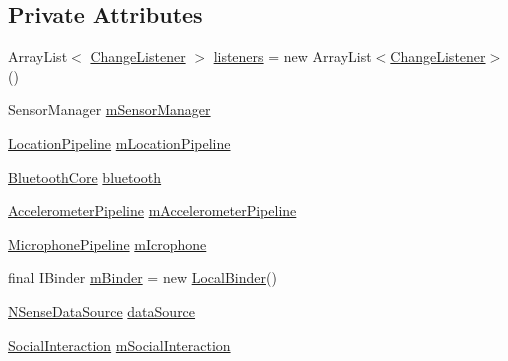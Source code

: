 \subsection*{Private Attributes}
\begin{DoxyCompactItemize}
\item 
Array\-List$<$ \hyperlink{interfacecs_1_1nsense_1_1_change_listener}{Change\-Listener} $>$ \hyperlink{classcs_1_1nsense_1_1_n_sense_service_add437e668afb02ec0fa1c2f20d6cc5df}{listeners} = new Array\-List$<$\hyperlink{interfacecs_1_1nsense_1_1_change_listener}{Change\-Listener}$>$ ()
\item 
Sensor\-Manager \hyperlink{classcs_1_1nsense_1_1_n_sense_service_a663bbb3131b12621b8cf583266d82ead}{m\-Sensor\-Manager}
\item 
\hyperlink{classcs_1_1nsense_1_1location_1_1_location_pipeline}{Location\-Pipeline} \hyperlink{classcs_1_1nsense_1_1_n_sense_service_aa18b9de5a2460c02a578f608c280d1c7}{m\-Location\-Pipeline}
\item 
\hyperlink{classcs_1_1nsense_1_1bluetooth_1_1_bluetooth_core}{Bluetooth\-Core} \hyperlink{classcs_1_1nsense_1_1_n_sense_service_aacd6c54af2899f5ea8e97c4082eadea6}{bluetooth}
\item 
\hyperlink{classcs_1_1nsense_1_1accelerometer_1_1_accelerometer_pipeline}{Accelerometer\-Pipeline} \hyperlink{classcs_1_1nsense_1_1_n_sense_service_a3ce1d75779f97340739041615c544825}{m\-Accelerometer\-Pipeline}
\item 
\hyperlink{classcs_1_1nsense_1_1microphone_1_1_microphone_pipeline}{Microphone\-Pipeline} \hyperlink{classcs_1_1nsense_1_1_n_sense_service_ad27f819aab4981845361ab7accb646e3}{m\-Icrophone}
\item 
final I\-Binder \hyperlink{classcs_1_1nsense_1_1_n_sense_service_a600df19b5f1386cedb4cec1dcdc6bc1c}{m\-Binder} = new \hyperlink{classcs_1_1nsense_1_1_n_sense_service_1_1_local_binder}{Local\-Binder}()
\item 
\hyperlink{classcs_1_1nsense_1_1db_1_1_n_sense_data_source}{N\-Sense\-Data\-Source} \hyperlink{classcs_1_1nsense_1_1_n_sense_service_a754a38b7d533d212aadc065287f1684a}{data\-Source}
\item 
\hyperlink{classcs_1_1nsense_1_1inference_module_1_1_social_interaction}{Social\-Interaction} \hyperlink{classcs_1_1nsense_1_1_n_sense_service_a2e18e70a828e22a07fc06294c3392ad3}{m\-Social\-Interaction}
\end{DoxyCompactItemize}
